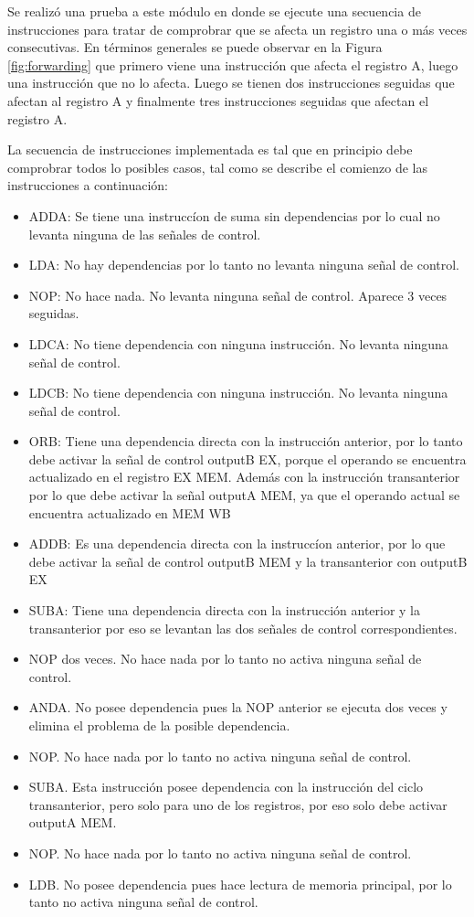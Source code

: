 Se realiz\' o una prueba a este m\' odulo en donde se ejecute una secuencia de instrucciones para tratar de comprobrar que se afecta un registro una o m\' as veces consecutivas. En t\' erminos generales se puede observar en la Figura \ref{fig:forwarding} que primero viene una instrucci\' on que afecta el registro A, luego una instrucci\' on que no lo afecta. Luego se tienen dos instrucciones seguidas que afectan al registro A y finalmente tres instrucciones seguidas que afectan el registro A.

La secuencia de instrucciones implementada es tal que en principio debe comprobrar todos lo posibles casos, tal como se describe el comienzo de las instrucciones a continuaci\' on: 

\begin{itemize}
\item  ADDA: Se tiene una instrucc\' ion de suma sin dependencias por lo cual no levanta ninguna de las se\~ nales de control.
\item LDA: No hay dependencias por lo tanto no levanta ninguna se\~ nal de control.
\item NOP: No hace nada. No levanta ninguna se\~ nal de control. Aparece 3 veces seguidas.
\item LDCA: No tiene dependencia con ninguna instrucci\' on. No levanta ninguna se\~ nal de control.
\item LDCB: No tiene dependencia con ninguna instrucci\' on. No levanta ninguna se\~ nal de control.	 	
\item ORB: Tiene una dependencia directa con la instrucci\' on anterior, por lo tanto debe activar la se\~ nal de control outputB EX, porque el operando se encuentra actualizado en el registro EX MEM. Adem\' as con la instrucci\' on transanterior por lo que debe activar la se\~ nal outputA MEM, ya que el operando actual se encuentra actualizado en MEM WB
\item ADDB: Es una dependencia directa con la instrucc\' ion anterior, por lo que debe activar la se\~ nal de control outputB MEM y la transanterior con outputB EX
\item SUBA: Tiene una dependencia directa con la instrucci\' on anterior y la transanterior por eso se levantan las dos se\~ nales de control correspondientes.
\item NOP dos veces. No hace nada por lo tanto no activa ninguna se\~ nal de control.
\item ANDA. No posee dependencia pues la NOP anterior se ejecuta dos veces y elimina el problema de la posible dependencia.
\item NOP. No hace nada por lo tanto no activa ninguna se\~ nal de control.
\item SUBA. Esta instrucci\' on posee dependencia con la instrucci\' on del ciclo transanterior, pero solo para uno de los registros, por eso solo debe activar outputA MEM.
\item NOP. No hace nada por lo tanto no activa ninguna se\~ nal de control.
\item LDB. No posee dependencia pues hace lectura de memoria principal, por lo tanto no activa ninguna se\~ nal de control.
\end{itemize}	

